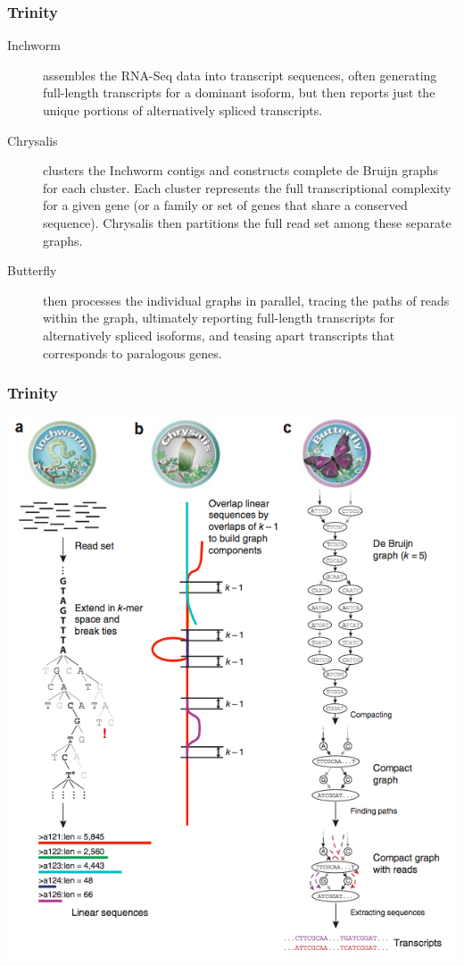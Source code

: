 \documentclass[pdf]{beamer}
\begin{document}
\begin{frame}
  \frametitle{Trinity}
  \begin{description}
    \item [Inchworm] assembles the RNA-Seq data into transcript sequences, often generating full-length transcripts for a dominant isoform, but then reports just the unique portions of alternatively spliced transcripts.
    \item [Chrysalis] clusters the Inchworm contigs and constructs complete de Bruijn graphs for each cluster. Each cluster represents the full transcriptional complexity for a given gene (or a family or set of genes that share a conserved sequence). Chrysalis then partitions the full read set among these separate graphs.
    \item [Butterfly] then processes the individual graphs in parallel, tracing the paths of reads within the graph, ultimately reporting full-length transcripts for alternatively spliced isoforms, and teasing apart transcripts that corresponds to paralogous genes.
  \end{description}
\end{frame}

\begin{frame}
  \frametitle{Trinity}
  \begin{center}
  \includegraphics[scale=.25]{Figures/trinity.png} 
  \end{center}
\end{frame}
\end{document}
